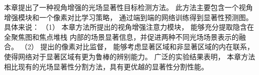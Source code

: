 
本章提出了一种视角增强的光场显著性目标检测方法。
此方法主要包含一个视角增强模块和一个像素对比学习策略，
通过端到端的网络训练得到显著性预测图。
具体来说：
（1）
本章方法所提出的视角增强注意力模块，
能够充分提取隐含在全聚焦图和焦点堆栈
内部的场景显著信息，并促进两种不同光场场景表示的融合。
（2）
提出的像素对比监督，
能够考虑显著区域和非显著区域的内在联系，
使得网络对于显著区域有更为鲁棒的辨别能力。
广泛的实验结果表明，
本章方法相比现有的光场显著性分割方法，具有更优越的显著性分割性能。








